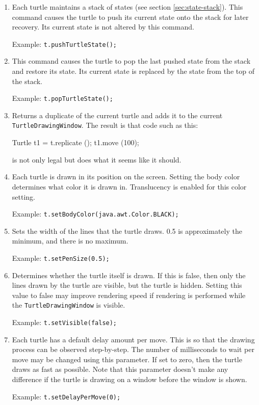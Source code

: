 \documentclass{article}
\newenvironment{commandtable}
  {\begin{enumerate}}
  {\end{enumerate}}
\def\command[#1]{\item[\tt #1]}
\def\example[#1]{\par Example: {\tt #1}}
\begin{document}
      \begin{commandtable}
	\command[pushTurtleState]
	Each turtle maintains a stack of states (see section
	\ref{sec:state-stack}). This command causes the turtle to push its
	current state onto the stack for later recovery. Its current state is
	not altered by this command.
	\example[t.pushTurtleState();]

	\command[popTurtleState]
	This command causes the turtle to pop the last pushed state from the
	stack and restore its state. Its current state is replaced by the state
	from the top of the stack.
	\example[t.popTurtleState();]

	\command[replicate]
	Returns a duplicate of the current turtle and adds it to the current
	{\tt TurtleDrawingWindow}. The result is that code such as this:

	\lstset{gobble=10}
	\begin{java}
	  Turtle t1 = t.replicate ();
	  t1.move (100);
	\end{java}

	\noindent is not only legal but does what it seems like it should.

	\command[setBodyColor]
	Each turtle is drawn in its position on the screen. Setting the body
	color determines what color it is drawn in. Translucency is enabled for
	this color setting.
	\example[t.setBodyColor(java.awt.Color.BLACK);]

	\command[setPenSize]
	Sets the width of the lines that the turtle draws. 0.5 is approximately
	the minimum, and there is no maximum.
	\example[t.setPenSize(0.5);]

	\command[setVisible]
	Determines whether the turtle itself is drawn. If this is false, then
	only the lines drawn by the turtle are visible, but the turtle is
	hidden. Setting this value to false may improve rendering speed if
	rendering is performed while the {\tt TurtleDrawingWindow} is visible.
	\example[t.setVisible(false);]

	\command[setDelayPerMove]
	Each turtle has a default delay amount per move. This is so that the
	drawing process can be observed step-by-step. The number of milliseconds
	to wait per move may be changed using this parameter. If set to zero,
	then the turtle draws as fast as possible. Note that this parameter
	doesn't make any difference if the turtle is drawing on a window before
	the window is shown.
	\example[t.setDelayPerMove(0);]
      \end{commandtable}
\end{document}
